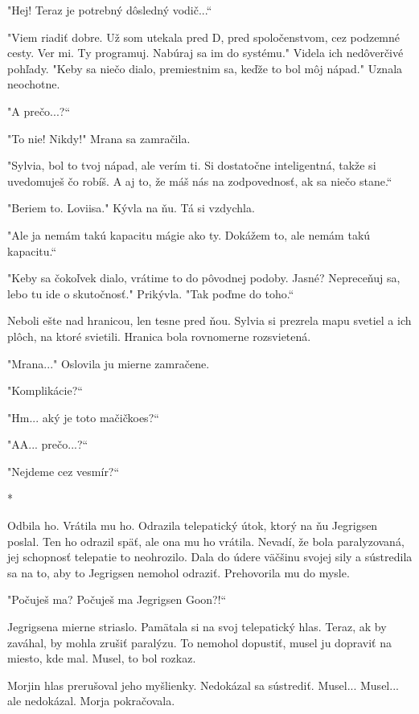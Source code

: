 \documentclass{book}
\begin{document}
"$ $Hej! Teraz je potrebný dôsledný vodič...“

"$ $Viem riadiť dobre. Už som utekala pred D, pred spoločenstvom, cez podzemné cesty. Ver mi. Ty programuj. Nabúraj sa im do systému."$ $ Videla ich nedôverčivé pohľady. "$ $Keby sa niečo dialo, premiestnim sa, keďže to bol môj nápad."$ $ Uznala neochotne.

"$ $A prečo...?“

"$ $To nie! Nikdy!"$ $ Mrana sa zamračila.

"$ $Sylvia, bol to tvoj nápad, ale verím ti. Si dostatočne inteligentná, takže si uvedomuješ čo robíš. A aj to, že máš nás na zodpovednosť, ak sa niečo stane.“

"$ $Beriem to. Loviisa."$ $ Kývla na ňu. Tá si vzdychla.

"$ $Ale ja nemám takú kapacitu mágie ako ty. Dokážem to, ale nemám takú kapacitu.“

"$ $Keby sa čokoľvek dialo, vrátime to do pôvodnej podoby. Jasné? Nepreceňuj sa, lebo tu ide o skutočnosť."$ $ Prikývla. "$ $Tak poďme do toho.“

Neboli ešte nad hranicou, len tesne pred ňou. Sylvia si prezrela mapu svetiel a ich plôch, na ktoré svietili. Hranica bola rovnomerne rozsvietená.

"$ $Mrana..."$ $ Oslovila ju mierne zamračene.

"$ $Komplikácie?“

"$ $Hm... aký je toto mačičkoes?“

"$ $AA... prečo...?“

"$ $Nejdeme cez vesmír?“

\begin{center}

*

\end{center}

Odbila ho. Vrátila mu ho. Odrazila telepatický útok, ktorý na ňu Jegrigsen poslal. Ten ho odrazil späť, ale ona mu ho vrátila. Nevadí, že bola paralyzovaná, jej schopnosť telepatie to neohrozilo. Dala do údere väčšinu svojej sily a sústredila sa na to, aby to Jegrigsen nemohol odraziť. Prehovorila mu do mysle.

"$ $Počuješ ma? Počuješ ma Jegrigsen Goon?!“

Jegrigsena mierne striaslo. Pamätala si na svoj telepatický hlas. Teraz, ak by zaváhal, by mohla zrušiť paralýzu. To nemohol dopustiť, musel ju dopraviť na miesto, kde mal. Musel, to bol rozkaz.

Morjin hlas prerušoval jeho myšlienky. Nedokázal sa sústrediť. Musel... Musel... ale nedokázal. Morja pokračovala.
\end{document}
